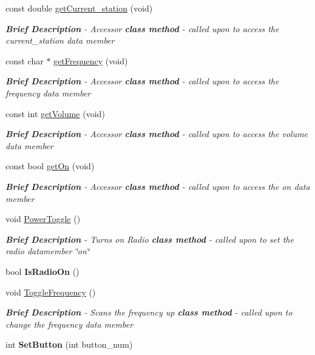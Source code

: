 \begin{DoxyCompactItemize}
const double \hyperlink{class_amfm_radio_a4ace80e241d0f88748239449f5dab0bf}{get\-Current\-\_\-station} (void)
\begin{DoxyCompactList}\small\item\em {\bfseries Brief Description} -\/ Accessor {\bfseries {\itshape class method}} -\/ called upon to access the current\-\_\-station data member \end{DoxyCompactList}\item 
const char $\ast$ \hyperlink{class_amfm_radio_a4984511f7229e07eeef436a6dcc8e221}{get\-Frequency} (void)
\begin{DoxyCompactList}\small\item\em {\bfseries Brief Description} -\/ Accessor {\bfseries {\itshape class method}} -\/ called upon to access the frequency data member \end{DoxyCompactList}\item 
const int \hyperlink{class_amfm_radio_a12ab9c5559aade8cee0591e29c7123cf}{get\-Volume} (void)
\begin{DoxyCompactList}\small\item\em {\bfseries Brief Description} -\/ Accessor {\bfseries {\itshape class method}} -\/ called upon to access the volume data member \end{DoxyCompactList}\item 
const bool \hyperlink{class_amfm_radio_af13cfe510c8cf3e545b5a2b9f63e3e52}{get\-On} (void)
\begin{DoxyCompactList}\small\item\em {\bfseries Brief Description} -\/ Accessor {\bfseries {\itshape class method}} -\/ called upon to access the on data member \end{DoxyCompactList}\item 
void \hyperlink{class_amfm_radio_a8bef92f2e6c89805cabcaf23924e74bd}{Power\-Toggle} ()
\begin{DoxyCompactList}\small\item\em {\bfseries Brief Description} -\/ Turns on Radio {\bfseries {\itshape class method}} -\/ called upon to set the radio datamember \char`\"{}on\char`\"{} \end{DoxyCompactList}\item 
\hypertarget{class_amfm_radio_a2ec9b93879bfebf4899cf42d9e979b72}{bool {\bfseries Is\-Radio\-On} ()}\label{class_amfm_radio_a2ec9b93879bfebf4899cf42d9e979b72}

\item 
void \hyperlink{class_amfm_radio_abc3d94ff62937e4bcbec6406ad515d7b}{Toggle\-Frequency} ()
\begin{DoxyCompactList}\small\item\em {\bfseries Brief Description} -\/ Scans the frequency up {\bfseries {\itshape class method}} -\/ called upon to change the frequency data member \end{DoxyCompactList}\item 
\hypertarget{class_amfm_radio_acd68b0df9f3c09c2f181f31b90513797}{int {\bfseries Set\-Button} (int button\-\_\-num)}\label{class_amfm_radio_acd68b0df9f3c09c2f181f31b90513797}


\end{DoxyCompactItemize}
